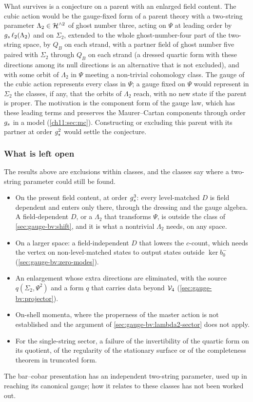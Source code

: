 \noindent{} What survives is a conjecture on a parent with an enlarged field content.
The cubic action would be the gauge-fixed form of a parent theory with a two-string parameter $\Lambda_2 \in \mathcal{H}^{\wedge 2}$ of ghost number three, acting on $\Psi$ at leading order by $g_s \, \ell_2(\Lambda_2)$ and on $\Sigma_2$, extended to the whole ghost-number-four part of the two-string space, by $Q_B$ on each strand, with a partner field of ghost number five paired with $\Sigma_2$ through $Q_B$ on each strand (a dressed quartic form with these directions among its null directions is an alternative that is not excluded), and with some orbit of $\Lambda_2$ in $\Psi$ meeting a non-trivial cohomology class.
The gauge of the cubic action represents every class in $\Psi$; a gauge fixed on $\Psi$ would represent in $\Sigma_2$ the classes, if any, that the orbits of $\Lambda_2$ reach, with no new state if the parent is proper.
The motivation is the component form of the \IBL{} gauge law, which has these leading terms and preserves the Maurer--Cartan components through order $g_s$ in a model (\cref{ch11:sec:mc}).
Constructing or excluding this parent with its partner at order $g_s^2$ would settle the conjecture.

\subsubsection{What is left open}
\label{sec:gauge-bv:unfixing-open}

The results above are exclusions within classes, and the classes say where a two-string parameter could still be found.
\begin{itemize}
  \setlength{\itemsep}{1ex}

  \item On the present field content, at order $g_s^3$: every level-matched $D$ is field dependent and enters only there, through the dressing and the gauge algebra.
    A field-dependent $D$, or a $\Lambda_2$ that transforms $\Psi$, is outside the class of \cref{sec:gauge-bv:shift}, and it is what a nontrivial $\Lambda_2$ needs, on any space.
  \item On a larger space: a field-independent $D$ that lowers the $c$-count, which needs the vertex on non-level-matched states to output states outside $\ker b_0^-$ (\cref{sec:gauge-bv:zero-modes}).
  \item An enlargement whose extra directions are eliminated, with the source $q(\Sigma_2, \Psi^2)$ and a form $q$ that carries data beyond $\mathcal{V}_{4}$ (\cref{sec:gauge-bv:projector}).
  \item On-shell momenta, where the properness of the master action is not established and the argument of \cref{sec:gauge-bv:lambda2-sector} does not apply.
  \item For the single-string sector, a failure of the invertibility of the quartic form on its quotient, of the regularity of the stationary surface or of the completeness theorem in truncated form.
\end{itemize}
The bar--cobar presentation has an independent two-string parameter, used up in reaching its canonical gauge; how it relates to these classes has not been worked out.
